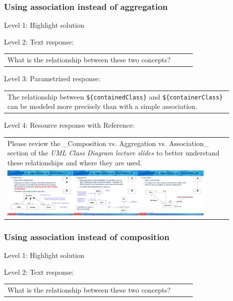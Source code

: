 \subsubsection{Using association instead of aggregation}

\noindent Level 1: Highlight solution \medskip

\noindent Level 2: Text response: \medskip

\begin{tabular}{|p{0.9\linewidth}}
What is the relationship between these two concepts?
\end{tabular} \medskip

\noindent Level 3: Parametrized response: \medskip

\begin{tabular}{|p{0.9\linewidth}}
The relationship between \verb|${containedClass}| and \verb|${containerClass}| can be modeled more precisely than with a simple association.
\end{tabular} \medskip

\noindent Level 4: Resource response with Reference: \medskip

\begin{tabular}{|p{0.9\linewidth}}
Please review the _Composition vs. Aggregation vs. Association_ section of 
the \textit{UML Class Diagram lecture slides} to 
better understand these relationships and where they are used.

\\
\includegraphics[width=0.9\textwidth]{images/composition_aggregation_association.png}
\end{tabular} \medskip


\subsubsection{Using association instead of composition}

\noindent Level 1: Highlight solution \medskip

\noindent Level 2: Text response: \medskip

\begin{tabular}{|p{0.9\linewidth}}
What is the relationship between these two concepts?
\end{tabular} \medskip

